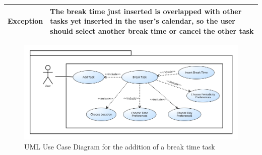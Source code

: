 \begin{table}[H]
\begin{tabular}{|p{3.5cm}|p{10.3cm}|}
    \hline
    \textbf{\large{Exception}} 			& The break time just inserted is overlapped with other tasks                                         yet inserted in the user's calendar, so the user should                                           select another break time or cancel the other task\\
    
    \hline
    
    
    \end{tabular}
	
\end{table}

\begin{figure}[H]
\centering
\includegraphics[scale=0.5]{Pictures/UseCaseDiagram/Add_a_break_time.png}
\caption{UML Use Case Diagram for the addition of a break time task }
\end{figure}
